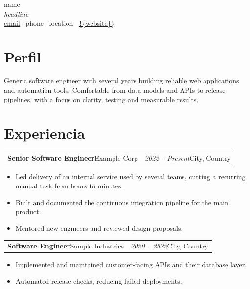 \documentclass[11pt,a4paper]{article}
\makeatletter
\newcommand{\lblProfile}{Profile}
\newcommand{\lblExperience}{Experience}
\renewcommand{\lblProfile}{Perfil}
\renewcommand{\lblExperience}{Experiencia}
\newcommand{\cventry}[4]{%
  \begin{tabularx}{\textwidth}{@{}>{\raggedright\arraybackslash}X>{\raggedleft\arraybackslash}p{4.2cm}@{}}
    \textbf{#1}\newline #2 & \textit{#3}\newline #4 \\
  \end{tabularx}\vspace{-2pt}%
}
\makeatother
\begin{document}
  \begin{center}
    {\fontsize{26}{30}\selectfont\color{cvgarnet} {{name}}}\\[4pt]
    {\large\itshape\color{cvgray} {{headline}}}\\[2pt]
    {\small
      \href{mailto:{{email}}}{{{email}}} \textbar\
      {{phone}} \textbar\
      {{location}} \textbar\
      \url{{{website}}}}
  \end{center}
  \vspace{-2pt}

  \section*{\lblProfile}
  Generic software engineer with several years building reliable web
  applications and automation tools. Comfortable from data models and APIs to
  release pipelines, with a focus on clarity, testing and measurable results.

  \section*{\lblExperience}

  \cventry{Senior Software Engineer}{Example Corp}{2022 -- Present}{City, Country}
  \begin{itemize}
    \item Led delivery of an internal service used by several teams, cutting a
    recurring manual task from hours to minutes.
    \item Built and documented the continuous integration pipeline for the main
    product.
    \item Mentored new engineers and reviewed design proposals.
  \end{itemize}

  \cventry{Software Engineer}{Sample Industries}{2020 -- 2022}{City, Country}
  \begin{itemize}
    \item Implemented and maintained customer-facing APIs and their database
    layer.
    \item Automated release checks, reducing failed deployments.
  \end{itemize}
\end{document}
